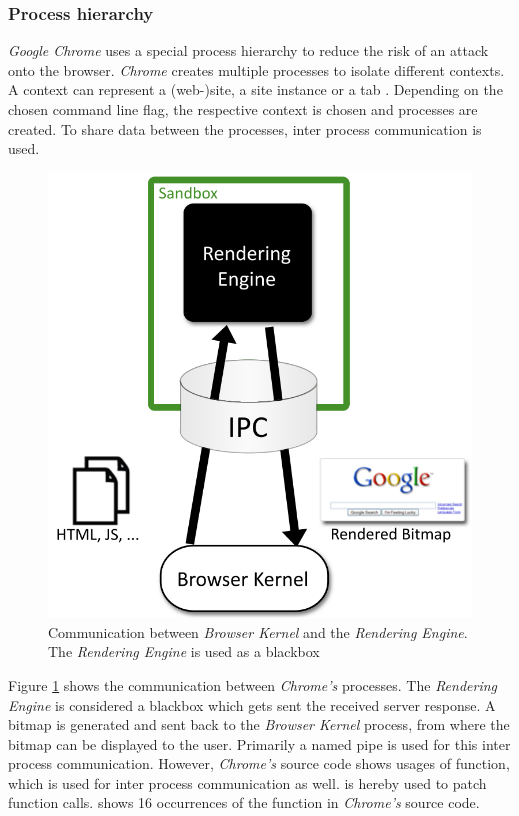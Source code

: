 \subsubsection{Process hierarchy}
\emph{Google Chrome} uses a special process hierarchy to reduce the risk of an attack onto the browser. \emph{Chrome} creates multiple processes to isolate different contexts. A context can represent a (web-)site, a site instance or a tab \cite{chromium_process_models}. Depending on the chosen command line flag, the respective context is chosen and processes are created. To share data between the processes, inter process communication is used.
\begin{figure}[h]
\centering
\includegraphics[scale=0.5]{sections/background/chrome/communication.png}
\caption{Communication between \emph{Browser Kernel} and the \emph{Rendering Engine}. The \emph{Rendering Engine} is used as a blackbox \cite{chromium_security_architecture}}
\label{fig:chrome_communication}
\end{figure}
Figure \ref{fig:chrome_communication} shows the communication between \emph{Chrome's} processes. The \emph{Rendering Engine} is considered a blackbox which gets sent the received server response. A bitmap is generated and sent back to the \emph{Browser Kernel} process, from where the bitmap can be displayed to the user. Primarily a named pipe \cite{chromium_security_architecture} is used for this inter process communication. However, \emph{Chrome's} source code shows usages of  function, which is used for inter process communication as well.  is hereby used to patch function calls. \cite{chromium_source_writeprocessmemory} shows 16 occurrences of the  function in \emph{Chrome's} source code.
